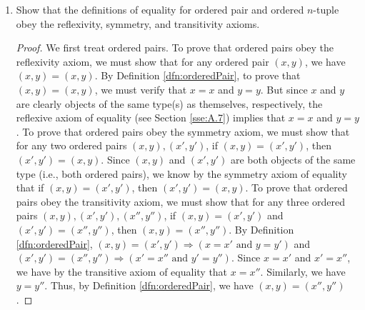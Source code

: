 \documentclass[../main.tex]{subfiles}
\begin{document}
\begin{enumerate}[ref={\thesection.\arabic*}]
\begin{proof}
\begin{enumerate}[label={(\arabic*)}]
        \end{enumerate}
        Therefore, $x=x'$ and $y=y'$. Now suppose that $x=x'$ and $y=y'$. To prove that $\{\{x\},\{x,y\}\}=\{\{x'\},\{x',y'\}\}$, Definition \ref{dfn:setEquality} tells us that it will suffice to show that every element of $\{\{x\},\{x,y\}\}$ is an element of $\{\{x'\},\{x',y'\}\}$ and vice versa. By Axiom \ref{axm:singletonPair}, the only elements of $\{\{x\},\{x,y\}\}$ are $\{x\}$ and $\{x,y\}$, so to show that every element of $\{\{x\},\{x,y\}\}$ is an element of $\{\{x'\},\{x',y'\}\}$, we need only verify that both $\{x\}$ and $\{x,y\}$ are elements of $\{\{x'\},\{x',y'\}\}$. Since $x=x'$, Lemma \ref{lem:singletonPairSetEquality} guarantees that $\{x\}=\{x'\}$. But by Axiom \ref{axm:singletonPair}, this implies that $\{x\}\in\{\{x'\},\{x',y'\}\}$. On the other hand, since $x=x'$ and $y=y'$, we have by consecutive applications of Lemma \ref{lem:singletonPairSetEquality} that $\{x,y\}=\{x',y'\}$. But by Axiom \ref{axm:singletonPair}, this implies that $\{x,y\}\in\{\{x'\},\{x',y'\}\}$. A similar argument can show that every element of $\{\{x'\},\{x',y'\}\}$ is an element of $\{\{x\},\{x,y\}\}$. Therefore, $\{\{x\},\{x,y\}\}=\{\{x'\},\{x',y'\}\}$.
    \end{proof}
    \setcounter{enumi}{2}
    \item \label{exr:3.5.3}Show that the definitions of equality for ordered pair and ordered $n$-tuple obey the reflexivity, symmetry, and transitivity axioms.
    \begin{proof}
        We first treat ordered pairs. To prove that ordered pairs obey the reflexivity axiom, we must show that for any ordered pair $(x,y)$, we have $(x,y)=(x,y)$. By Definition \ref{dfn:orderedPair}, to prove that $(x,y)=(x,y)$, we must verify that $x=x$ and $y=y$. But since $x$ and $y$ are clearly objects of the same type(s) as themselves, respectively, the reflexive axiom of equality (see Section \ref{sse:A.7}) implies that $x=x$ and $y=y$. To prove that ordered pairs obey the symmetry axiom, we must show that for any two ordered pairs $(x,y),(x',y')$, if $(x,y)=(x',y')$, then $(x',y')=(x,y)$. Since $(x,y)$ and $(x',y')$ are both objects of the same type (i.e., both ordered pairs), we know by the symmetry axiom of equality that if $(x,y)=(x',y')$, then $(x',y')=(x,y)$. To prove that ordered pairs obey the transitivity axiom, we must show that for any three ordered pairs $(x,y),(x',y'),(x'',y'')$, if $(x,y)=(x',y')$ and $(x',y')=(x'',y'')$, then $(x,y)=(x'',y'')$. By Definition \ref{dfn:orderedPair}, $(x,y)=(x',y') \Longrightarrow (x=x'\text{ and }y=y')$ and $(x',y')=(x'',y'') \Longrightarrow (x'=x''\text{ and }y'=y'')$. Since $x=x'$ and $x'=x''$, we have by the transitive axiom of equality that $x=x''$. Similarly, we have $y=y''$. Thus, by Definition \ref{dfn:orderedPair}, we have $(x,y)=(x'',y'')$.
    \end{proof}
\end{enumerate}
\end{document}
